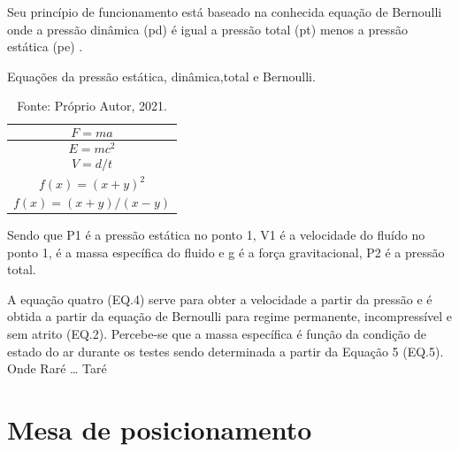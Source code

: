 Seu princípio de funcionamento está baseado na conhecida equação de Bernoulli onde  a pressão dinâmica (pd) 
é igual a pressão total (pt) menos a pressão estática (pe) \cite{pritchard2005fox}.

\begin{table}
    \centering
    \caption{Equações da pressão estática, dinâmica,total e Bernoulli.}
    \begin{tabular}{l}
        \hline
        \begin{equation}
            F = ma
        \end{equation}\\
        \hline   
        \begin{equation}
            E = mc^2  
        \end{equation}\\
        \hline   
        \begin{equation}
            V = d / t
        \end{equation}\\
        \hline   
        \begin{equation}
            f(x) = (x+y)^2
        \end{equation}\\
        \hline   
        \begin{equation}
            f(x) = (x+y)/(x-y)
        \end{equation}\\
        \hline       
    \end{tabular}
    \caption*{Fonte: Próprio Autor, 2021.}
    \label{tab:equacoes}
\end{table}


Sendo que P1  é a pressão estática no ponto 1, V1 é a velocidade do fluído no ponto 1, é a massa  específica do fluido 
e g é a força gravitacional, P2 é a pressão total.

A equação quatro (EQ.4) serve para obter a velocidade a partir da pressão e é obtida a partir da equação de 
Bernoulli para regime permanente, incompressível e sem atrito (EQ.2). Percebe-se que a massa específica é 
função da condição de estado do ar durante os testes sendo determinada a partir da Equação 5 (EQ.5). 
Onde Raré  … Taré

\section{Mesa de posicionamento}\label{sec:mesa}

